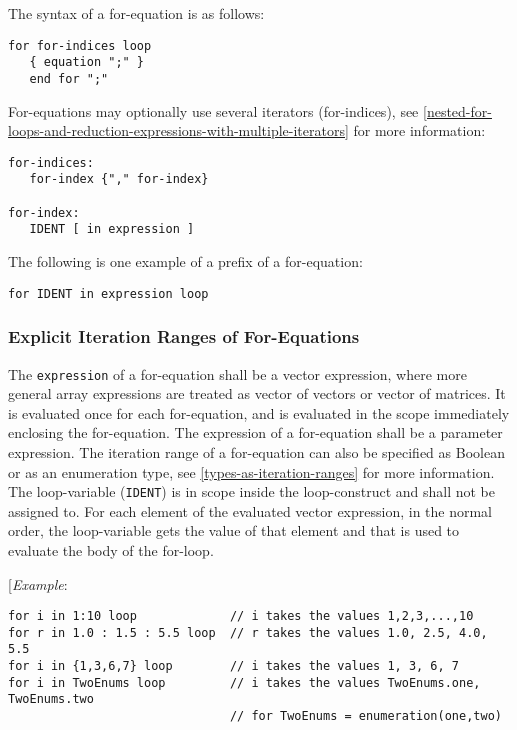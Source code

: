 The syntax of a for-equation is as follows:
\begin{lstlisting}[language=grammar]
for for-indices loop
   { equation ";" }
   end for ";"
\end{lstlisting}

For-equations may optionally use several iterators (for-indices), see
\autoref{nested-for-loops-and-reduction-expressions-with-multiple-iterators} for more information:
\begin{lstlisting}[language=grammar]
for-indices:
   for-index {"," for-index}

for-index:
   IDENT [ in expression ]
\end{lstlisting}

The following is one example of a prefix of a for-equation:
\begin{lstlisting}[language=grammar]
for IDENT in expression loop
\end{lstlisting}

\subsubsection{Explicit Iteration Ranges of For-Equations}
The \lstinline!expression! of a for-equation shall be a vector expression,
where more general array expressions are treated as vector of vectors or vector of matrices.
It is evaluated once for each for-equation, and is evaluated in the scope
immediately enclosing the for-equation. The expression of a for-equation
shall be a parameter expression. The iteration range of a for-equation
can also be specified as Boolean or as an enumeration type, see
\autoref{types-as-iteration-ranges} for more information. The loop-variable (\lstinline!IDENT!) is in scope
inside the loop-construct and shall not be assigned to.
For each element of the evaluated vector expression, in the normal order, the loop-variable
gets the value of that element and that is used to evaluate the body of the for-loop.

{[}\emph{Example}:
\begin{lstlisting}[language=modelica]
for i in 1:10 loop             // i takes the values 1,2,3,...,10
for r in 1.0 : 1.5 : 5.5 loop  // r takes the values 1.0, 2.5, 4.0, 5.5
for i in {1,3,6,7} loop        // i takes the values 1, 3, 6, 7
for i in TwoEnums loop         // i takes the values TwoEnums.one, TwoEnums.two
                               // for TwoEnums = enumeration(one,two)
\end{lstlisting}


